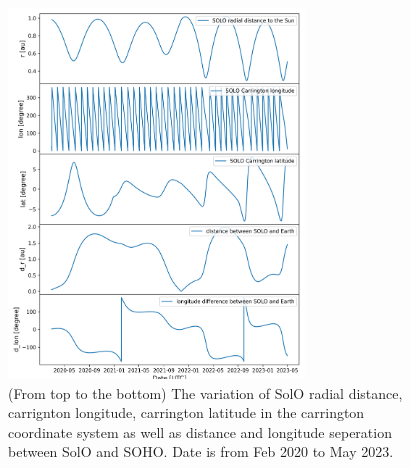 



\begin{figure}
    \centering
    \includegraphics[width = 0.7\textwidth]{images/ACR/SOLO_orbit_helioscentric_3.png}
    \caption[The orbit variation of \ac{SolO} in carrington coordinate system]{(From top to the bottom) The variation of \ac{SolO} radial distance, carrignton longitude, carrington latitude in the carrington coordinate system as well as distance and longitude seperation between \ac{SolO} and \ac{SOHO}. Date is from Feb 2020 to May 2023. }
    \label{fig:SOLO_orbit_info}
\end{figure}
